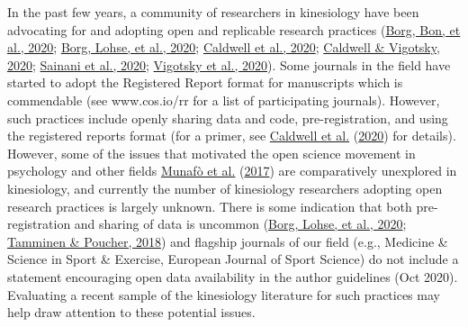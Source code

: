 \documentclass[]{cik}%
\begin{document}
In the past few years, a community of researchers in kinesiology have
been advocating for and adopting open and replicable research practices
(\protect\hyperlink{ref-Borg_Bon_Sainani_Baguley_Tierney_Drovandi_2020}{Borg,
Bon, et al., 2020};
\protect\hyperlink{ref-Borg_Lohse_Sainani_2020}{Borg, Lohse, et al.,
2020}; \protect\hyperlink{ref-caldwell_moving_2020}{Caldwell et al.,
2020}; \protect\hyperlink{ref-Caldwell_Vigotsky_2020}{Caldwell \&
Vigotsky, 2020}; \protect\hyperlink{ref-sainani2020}{Sainani et al.,
2020};
\protect\hyperlink{ref-Vigotsky_Nuckols_Heathers_Krieger_Schoenfeld_Steele_2020}{Vigotsky
et al., 2020}). Some journals in the field have started to adopt the
Registered Report format for manuscripts which is commendable (see
www.cos.io/rr for a list of participating journals). However, such
practices include openly sharing data and code, pre-registration, and
using the registered reports format (for a primer, see
\protect\hyperlink{ref-caldwell_moving_2020}{Caldwell et al.}
(\protect\hyperlink{ref-caldwell_moving_2020}{2020}) for details).
However, some of the issues that motivated the open science movement in
psychology and other fields
\protect\hyperlink{ref-munafo_manifesto_2017}{Munafò et al.}
(\protect\hyperlink{ref-munafo_manifesto_2017}{2017}) are comparatively
unexplored in kinesiology, and currently the number of kinesiology
researchers adopting open research practices is largely unknown. There
is some indication that both pre-registration and sharing of data is
uncommon (\protect\hyperlink{ref-Borg_Lohse_Sainani_2020}{Borg, Lohse,
et al., 2020}; \protect\hyperlink{ref-Tamminen_Poucher_2018}{Tamminen \&
Poucher, 2018}) and flagship journals of our field (e.g., Medicine \&
Science in Sport \& Exercise, European Journal of Sport Science) do not
include a statement encouraging open data availability in the author
guidelines (Oct 2020). Evaluating a recent sample of the kinesiology
literature for such practices may help draw attention to these potential
issues.
\end{document}
